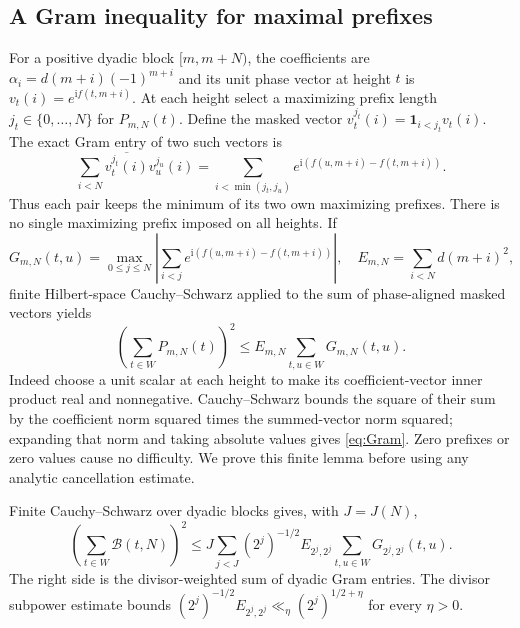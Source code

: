 \documentclass[11pt,a4paper]{article}
\numberwithin{equation}{section}
\theoremstyle{definition}
\newcommand{\ii}{\mathrm i}
\begin{document}
\subsection{A Gram inequality for maximal prefixes}
For a positive dyadic block $[m,m+N)$, the coefficients are
$\alpha_i=d(m+i)(-1)^{m+i}$ and its unit phase vector at height $t$ is
$v_t(i)=e^{\ii f(t,m+i)}$. At each height select a maximizing prefix length
$j_t\in\{0,\ldots,N\}$ for $P_{m,N}(t)$. Define the masked vector
$v_t^{j_t}(i)=\mathbf1_{i<j_t}v_t(i)$.
The exact Gram entry of two such vectors is
\[
 \sum_{i<N}\overline{v_t^{j_t}(i)}v_u^{j_u}(i)
   =\sum_{i<\min(j_t,j_u)}e^{\ii(f(u,m+i)-f(t,m+i))}.
\]
Thus each pair keeps the minimum of its two own maximizing prefixes. There is
no single maximizing prefix imposed on all heights. If
\[
 G_{m,N}(t,u)=\max_{0\le j\le N}
       \left|\sum_{i<j}e^{\ii(f(u,m+i)-f(t,m+i))}\right|,
 \quad E_{m,N}=\sum_{i<N}d(m+i)^2,
\]
finite Hilbert-space Cauchy--Schwarz applied to the sum of phase-aligned masked
vectors yields
\begin{equation}\label{eq:Gram}
 \left(\sum_{t\in W}P_{m,N}(t)\right)^2
          \le E_{m,N}\sum_{t,u\in W}G_{m,N}(t,u).
\end{equation}
Indeed choose a unit scalar at each height to make its coefficient-vector inner
product real and nonnegative. Cauchy--Schwarz bounds the square of their sum by
the coefficient norm squared times the summed-vector norm squared; expanding
that norm and taking absolute values gives \eqref{eq:Gram}. Zero prefixes or
zero values cause no difficulty. We prove this finite lemma before
using any analytic cancellation estimate.

Finite Cauchy--Schwarz over dyadic blocks gives, with $J=J(N)$,
\begin{equation}\label{eq:dyadicGram}
 \left(\sum_{t\in W}\mathscr B(t,N)\right)^2
 \le J\sum_{j<J}(2^j)^{-1/2}E_{2^j,2^j}
                        \sum_{t,u\in W}G_{2^j,2^j}(t,u).
\end{equation}
The right side is the divisor-weighted sum of dyadic Gram entries.
The divisor subpower estimate bounds
$(2^j)^{-1/2}E_{2^j,2^j}\ll_\eta(2^j)^{1/2+\eta}$ for every $\eta>0$.
\end{document}
